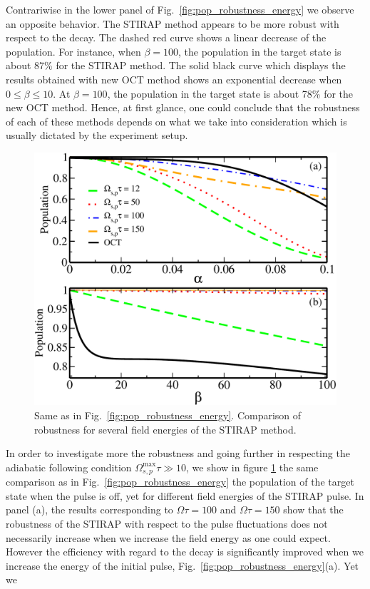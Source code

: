 \documentclass[]{interact}
\theoremstyle{plain}%
\theoremstyle{definition}
\theoremstyle{remark}
\begin{document}
Contrariwise in the lower panel of Fig.~\ref{fig:pop_robustness_energy} we 
observe an opposite behavior. The STIRAP method appears to be 
more robust with respect to the decay. The dashed red curve shows a linear 
decrease of the population. For instance, when $\beta=100$, 
the population in the target state is about 87\% for the STIRAP method. The
solid black curve which displays the results obtained with new OCT method shows 
an exponential decrease when $0\leq\beta\leq10$. At $\beta=100$, the population 
in the target state is about 78\% for the new OCT method.
Hence, at first glance, one could conclude that the robustness of each of these 
methods depends on what we take into consideration which is usually dictated by 
the experiment setup.
\begin{figure}[h!]
\centering
\includegraphics[width=0.7\linewidth]{Figure9}
\caption{ Same as in Fig.~\ref{fig:pop_robustness_energy}.
Comparison of robustness for several field energies of the STIRAP method.}
\label{fig:pop_robustness}
\end{figure}
In order to investigate more the robustness and going further in 
respecting the adiabatic following condition 
$\Omega_{s,p}^{\mathrm{max}}\tau\gg 
10$, we show in figure \ref{fig:pop_robustness} the same comparison as in
Fig.~\ref{fig:pop_robustness_energy} the population of the 
target state when the pulse is off, yet for different field energies of the 
STIRAP pulse. In panel (a), the results corresponding to $\Omega\tau=100$ and 
$\Omega\tau=150$ show that the robustness of the STIRAP with respect to the 
pulse fluctuations does not necessarily increase when we increase the field 
energy as one could expect. However the efficiency with regard to the 
decay is significantly improved when we increase the energy of the initial 
pulse, Fig.~\ref{fig:pop_robustness_energy}(a). Yet we 
\end{document}
